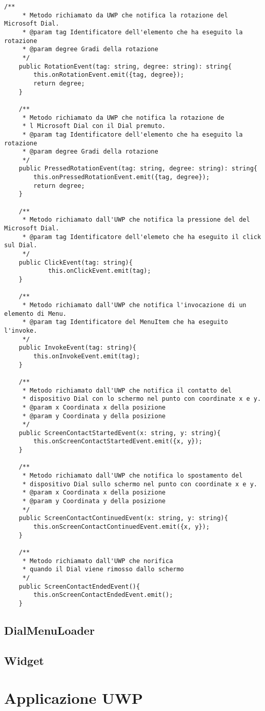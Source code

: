 \newpage
\vspace{1.0cm}
\begin{lstlisting}[caption={Metodi esposti da DialFrontendBridge},style=javaScriptCode]
   /**
     * Metodo richiamato da UWP che notifica la rotazione del Microsoft Dial.
     * @param tag Identificatore dell'elemento che ha eseguito la rotazione
     * @param degree Gradi della rotazione
     */
    public RotationEvent(tag: string, degree: string): string{
        this.onRotationEvent.emit({tag, degree});
        return degree;
    }

    /**
     * Metodo richiamato da UWP che notifica la rotazione de
     * l Microsoft Dial con il Dial premuto.
     * @param tag Identificatore dell'elemento che ha eseguito la rotazione
     * @param degree Gradi della rotazione
     */
    public PressedRotationEvent(tag: string, degree: string): string{
        this.onPressedRotationEvent.emit({tag, degree});
        return degree;
    }

    /**
     * Metodo richiamato dall'UWP che notifica la pressione del del Microsoft Dial.
     * @param tag Identificatore dell'elemeto che ha eseguito il click sul Dial.
     */
    public ClickEvent(tag: string){
            this.onClickEvent.emit(tag);
    }

    /**
     * Metodo richiamato dall'UWP che notifica l'invocazione di un elemento di Menu.
     * @param tag Identificatore del MenuItem che ha eseguito l'invoke.
     */
    public InvokeEvent(tag: string){
        this.onInvokeEvent.emit(tag);
    }

    /**
     * Metodo richiamato dall'UWP che notifica il contatto del 
     * dispositivo Dial con lo schermo nel punto con coordinate x e y.
     * @param x Coordinata x della posizione
     * @param y Coordinata y della posizione
     */
    public ScreenContactStartedEvent(x: string, y: string){
        this.onScreenContactStartedEvent.emit({x, y});
    }

    /**
     * Metodo richiamato dall'UWP che notifica lo spostamento del 
     * dispositivo Dial sullo schermo nel punto con coordinate x e y.
     * @param x Coordinata x della posizione
     * @param y Coordinata y della posizione
     */
    public ScreenContactContinuedEvent(x: string, y: string){
        this.onScreenContactContinuedEvent.emit({x, y});
    }

    /**
     * Metodo richiamato dall'UWP che norifica 
     * quando il Dial viene rimosso dallo schermo
     */
    public ScreenContactEndedEvent(){
        this.onScreenContactEndedEvent.emit();
    }
\end{lstlisting} 
\vspace{1.0cm}

\subsection{DialMenuLoader}

\subsection{Widget}
 
\section{Applicazione UWP}